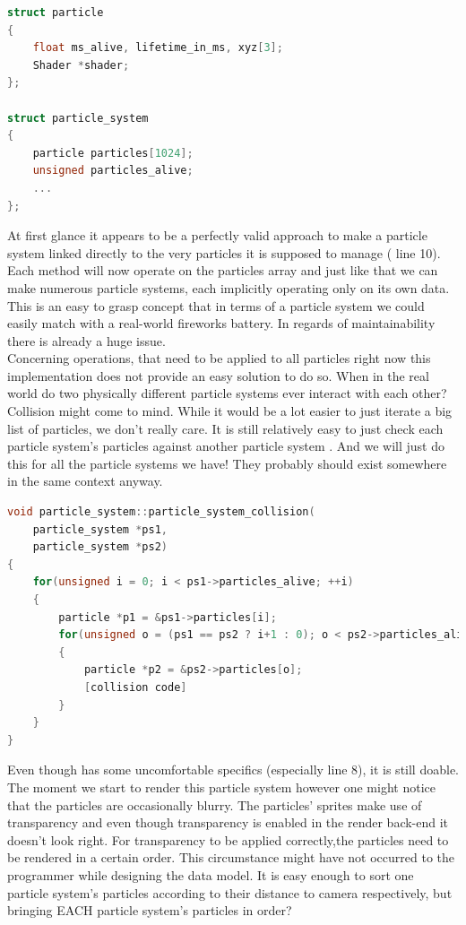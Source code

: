  \begin{lstlisting}[language=C++,name={ OOP typical, simplified particle system implementation},label={particle_system}]
struct particle
{
	float ms_alive, lifetime_in_ms, xyz[3];
	Shader *shader;
};

struct particle_system
{
	particle particles[1024];
	unsigned particles_alive;
	...
};
\end{lstlisting}
At first glance it appears to be a perfectly valid approach to make a particle system linked directly to the very particles it is supposed to manage ( line 10). Each method will now operate on the particles array and just like that we can make numerous particle systems, each implicitly operating only on its own data. This is an easy to grasp concept that in terms of a particle system we could easily match with a real-world fireworks battery. In regards of maintainability there is already a huge issue.\\
Concerning operations, that need to be applied to all particles right now this implementation does not provide an easy solution to do so. When in the real world do two physically different particle systems ever interact with each other? Collision might come to mind. While it would be a lot easier to just iterate a big list of particles, we don't really care. It is still relatively easy to just check each particle system's particles against another particle system . And we will just do this for all the particle systems we have! They probably should exist somewhere in the same context anyway.\\
 \begin{lstlisting}[language=C++,name={Example code how OOP could handle collision between different particle systems' particles},label={collision}]
void particle_system::particle_system_collision(
	particle_system *ps1,
	particle_system *ps2)
{
	for(unsigned i = 0; i < ps1->particles_alive; ++i)
	{
		particle *p1 = &ps1->particles[i];
		for(unsigned o = (ps1 == ps2 ? i+1 : 0); o < ps2->particles_alive; ++o)
		{
			particle *p2 = &ps2->particles[o];
			[collision code]
		}
	}
}
\end{lstlisting}
Even though  has some uncomfortable specifics (especially line 8), it is still doable. The moment we start to render this particle system however one might notice that the particles are occasionally blurry. The particles' sprites make use of transparency and even though transparency is enabled in the render back-end it doesn't look right. For transparency to be applied correctly,the particles need to be rendered in a certain order. This circumstance might have not occurred to the programmer while designing the data model. It is easy enough to sort one particle system's particles according to their distance to camera respectively, but bringing EACH particle system's particles in order?\\
